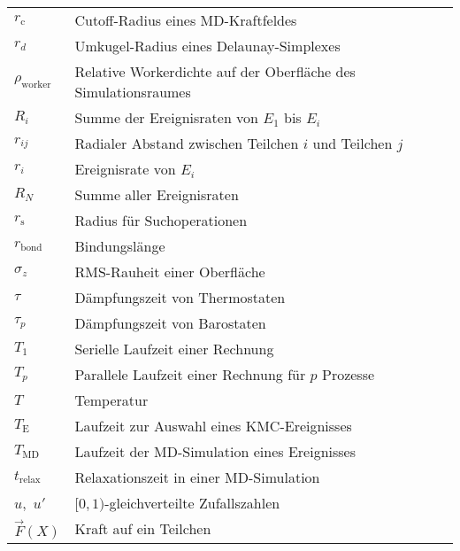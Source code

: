 \begin{longtable}{ll}
$r_\text{c}$         & Cutoff-Radius eines MD-Kraftfeldes                                  \\
$r_d$                & Umkugel-Radius eines Delaunay-Simplexes                             \\
$\rho_\text{worker}$ & Relative Workerdichte auf der Oberfläche des Simulationsraumes      \\
$R_i$                & Summe der Ereignisraten von $E_1$ bis $E_i$                         \\
$r_{ij}$             & Radialer Abstand zwischen Teilchen $i$ und Teilchen $j$             \\
$r_i$                & Ereignisrate von $E_i$                                              \\
$R_N$                & Summe aller Ereignisraten                                           \\
$r_\text{s}$         & Radius für Suchoperationen                                          \\
$r_\text{bond}$      & Bindungslänge                                                       \\
$\sigma_z$           & RMS-Rauheit einer Oberfläche                                        \\
$\tau$               & Dämpfungszeit von Thermostaten                                      \\
$\tau_p$             & Dämpfungszeit von Barostaten                                        \\
$T_1$                & Serielle Laufzeit einer Rechnung                                    \\
$T_p$                & Parallele Laufzeit einer Rechnung für $p$ Prozesse                  \\
$T$                  & Temperatur                                                          \\
$T_\text{E}$         & Laufzeit zur Auswahl eines KMC-Ereignisses                          \\
$T_\text{MD}$        & Laufzeit der MD-Simulation eines Ereignisses                        \\
$t_\text{relax}$     & Relaxationszeit in einer MD-Simulation                              \\
$u$,~$u'$            & $[0,1)$-gleichverteilte Zufallszahlen                               \\
$\vec F(X)$          & Kraft auf ein Teilchen                                              \\

\end{longtable}
